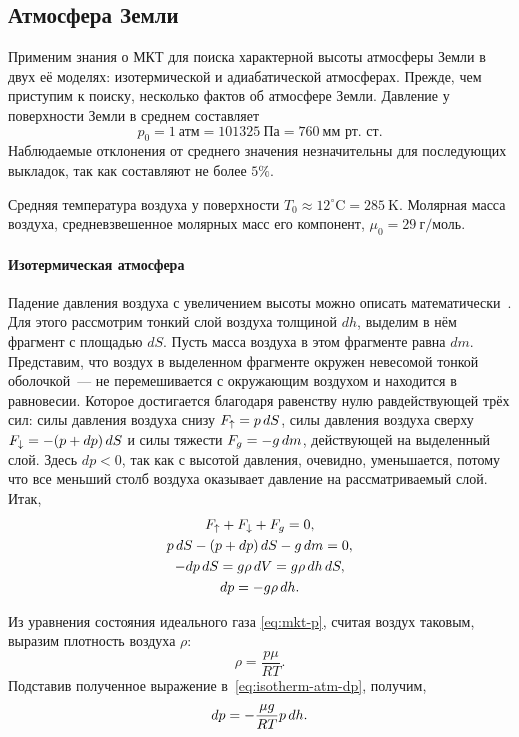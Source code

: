 \subsection{Атмосфера Земли}
Применим знания о МКТ для поиска характерной высоты атмосферы Земли в двух её моделях: изотермической и адиабатической атмосферах. Прежде, чем приступим к поиску, несколько фактов об атмосфере Земли. Давление у поверхности Земли в среднем составляет 
\begin{equation*}
	p_0 = 1~\text{атм} = 101325~\text{Па} = 760~\text{мм рт. ст}.
\end{equation*}
Наблюдаемые отклонения от среднего значения незначительны для последующих выкладок, так как составляют не более $5\%$. 

Средняя температура воздуха у поверхности $T_0 \approx 12^\circ\text{C} = 285~\text{K}$. Молярная масса воздуха, средневзвешенное молярных масс его компонент, $\mu_0 = 29~\text{г}/\text{моль}$. 

\paragraph{Изотермическая атмосфера} Падение давления воздуха с увеличением высоты можно описать математически~\cite{barometric-formula-isotermal}. Для этого рассмотрим тонкий слой воздуха толщиной $dh$, выделим в нём фрагмент с площадью $dS$. Пусть масса воздуха в этом фрагменте равна $dm$.  Представим, что воздух в выделенном фрагменте окружен невесомой тонкой оболочкой~--- не перемешивается с окружающим воздухом и находится в равновесии. Которое достигается благодаря равенству нулю равдействующей трёх сил: силы давления воздуха снизу $F_\uparrow = p\,d S$, силы давления воздуха сверху $F_\downarrow = -(p + dp)\,d S$ и силы тяжести $F_g = -g\,d m$, действующей на выделенный слой. Здесь $dp < 0$, так как с высотой давления, очевидно, уменьшается, потому что все меньший столб воздуха оказывает давление на рассматриваемый слой. Итак,
\begin{gather}
	F_\uparrow + F_\downarrow + F_g = 0,\nonumber\\
	p \,d S - (p + dp) \,d S - g \,d m = 0,\nonumber\\
	- dp\,d S = g \rho \,d V = g \rho \,d h \,d S,\nonumber\\
	dp = - g \rho \,d h. \label{eq:isotherm-atm-dp}
\end{gather}

Из уравнения состояния идеального газа \eqref{eq:mkt-p}, считая воздух таковым, выразим плотность воздуха $\rho$:
\begin{equation*}
	\rho = \frac{p \mu}{RT}.
\end{equation*}
Подставив полученное выражение в~\eqref{eq:isotherm-atm-dp}, получим,
\begin{equation}
	dp = - \frac{\mu g}{RT} p \,d h.
	\label{eq:earth-atm-dp}
\end{equation}

